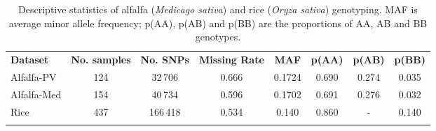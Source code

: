 \begin{table}
\centering
\caption[Descriptive statistics]{
Descriptive statistics of alfalfa (\emph{Medicago sativa}) 
and rice (\emph{Oryza sativa}) genotyping. MAF is average minor allele frequency; 
p(AA), p(AB) and p(BB) are the proportions of AA, AB and BB genotypes.}
\label{tab:descriptive_statistics}
\begin{tabular}{lccccccc}
\hline\noalign{\smallskip}
\noalign{\smallskip}\hline\noalign{\smallskip}
\textbf{Dataset} & \textbf{No. samples} & \textbf{No. SNPs} & \textbf{Missing Rate} & \textbf{MAF} & \textbf{p(AA)} & \textbf{p(AB)} & \textbf{p(BB)}\\
\noalign{\smallskip}\Xhline{3\arrayrulewidth}\noalign{\smallskip}
Alfalfa-PV & 124 & 32\,706 & 0.666 & 0.1724 & 0.690 & 0.274 & 0.035\\
Alfalfa-Med & 154 & 40\,734 & 0.596 & 0.1702 & 0.691 & 0.276 & 0.032\\
Rice & 437 & 166\,418 & 0.534 & 0.140 & 0.860 & - & 0.140 \\
\noalign{\smallskip}\hline
\end{tabular}
\end{table}
